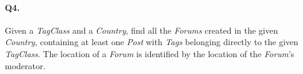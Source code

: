 \paragraph{Q4.}
Given a \emph{TagClass} and a \emph{Country}, find all the \emph{Forums}
created in the given \emph{Country}, containing at least one \emph{Post}
with \emph{Tags} belonging directly to the given \emph{TagClass}.
The location of a \emph{Forum} is identified by the location of the
\emph{Forum}'s moderator.
